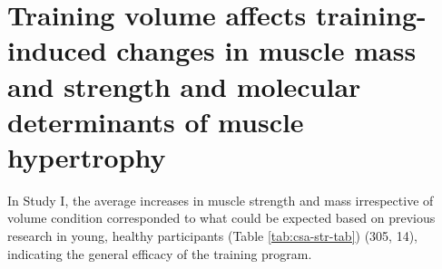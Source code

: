 \documentclass[twoside,10pt]{gihclass} %
\begin{document}
\hypertarget{muscle-mass-growth}{%
\section{Training volume affects training-induced changes in muscle mass and strength and molecular determinants of muscle hypertrophy}\label{muscle-mass-growth}}

In Study I, the average increases in muscle strength and mass irrespective of volume condition corresponded to what could be expected based on previous research in young, healthy participants (Table \ref{tab:csa-str-tab})
(305, 14),
indicating the general efficacy of the training program.




\begin{table}


\end{table}
\end{document}

